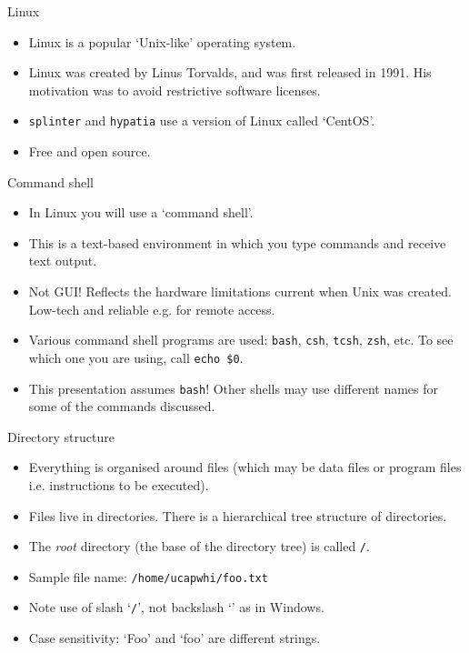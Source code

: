 \documentclass[dvipsnames]{beamer}
\newcommand{\command}[1]{\colorbox{light-gray}{\texttt{#1}}}
\newcommand{\filename}[1]{\colorbox{light-green}{\texttt{#1}}}
\newcommand{\server}[1]{\textcolor{BrickRed}{\texttt{#1}}}
\begin{document}
\begin{frame}{Linux}
  \begin{itemize}
    \item Linux is a popular `Unix-like' operating system.
    \item Linux was created by  Linus Torvalds, and was first released in 1991. His motivation was to avoid restrictive software licenses.
    \item \server{splinter} and \server{hypatia} use a version of Linux called `CentOS'.
    \item Free and open source.
   \end{itemize}
\end{frame}


\begin{frame}{Command shell}
  \begin{itemize}
    \item In Linux you will use a `command shell'.
    \item This is a text-based environment in which you type commands and receive text output.
    \item Not GUI! Reflects the hardware limitations current when Unix was created. Low-tech and reliable e.g. for remote access.
    \item Various command shell programs are used: \command{bash}, \command{csh}, \command{tcsh}, \command{zsh}, etc. To see which one you are using, call \command{echo \$0}.
    \item This presentation assumes \command{bash}! Other shells may use different names for some of the commands discussed.
   \end{itemize}
\end{frame}


\begin{frame}{Directory structure}
  \begin{itemize}
    \item Everything is organised around files (which may be data files or program files i.e. instructions to be executed).
    \item Files live in directories. There is a hierarchical tree structure of directories.
    \item The \textit{root} directory (the base of the directory tree) is called \filename{/}.
    \item Sample file name: \filename{/home/ucapwhi/foo.txt}
    \item Note use of slash `\texttt{/}', not backslash `\texttt{}' as in Windows.
    \item Case sensitivity: `Foo' and `foo' are different strings.
  \end{itemize}
\end{frame}
\end{document}
